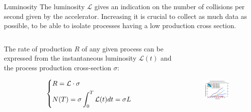 \documentclass[8pt]{beamer}
\begin{document}
\begin{frame}{Luminosity}
\justifying
The luminosity $\mathcal{L}$ gives an indication on the number of collisions per second given by the accelerator. Increasing it is crucial to collect as much data as possible, to be able to isolate processes
having a low production cross section. \vfill

\begin{columns}
	\begin{column}{0.4	\textwidth}
	\justifying	
The rate of production $R$ of any given process can be expressed from the instantaneous luminosity $\mathcal{L}(t)$ and the process production cross-section $\sigma$:	
	
\begin{equation*}
\begin{dcases}
R = \mathcal{L} \cdot \sigma \\
N(T) = \sigma \int_0^T \mathcal{L}(t) dt = \sigma L
\end{dcases}
\end{equation*}
\end{column}
\begin{column}{0.6	\textwidth}
\begin{figure}[htbp]
\begin{center}
\includegraphics[width=7cm, height=5cm]{figs/CumuLumi.pdf}
\end{center}
\end{figure}
\end{column}
\end{columns}

\end{frame}
\end{document}
